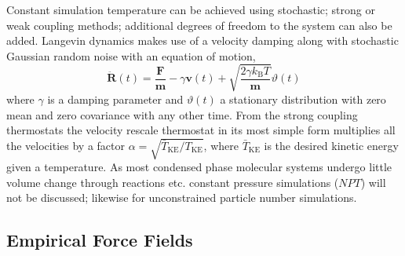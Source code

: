 \documentclass[main.tex]{subfiles}
\begin{document}
Constant simulation temperature can be achieved using stochastic; strong or weak coupling methods; additional degrees of freedom to the system can also be added. Langevin dynamics makes use of a velocity damping along with stochastic Gaussian random noise with an equation of motion,
\begin{equation}
	\ddot{\boldsymbol{R}}(t) = \frac{\boldsymbol{F}}{\boldsymbol{m}} - \gamma \boldsymbol{v}(t) + \sqrt{\frac{2\gamma k_\text{B} T}{\boldsymbol{m}}} \vartheta(t)
\end{equation}
where $\gamma$ is a damping parameter and $\vartheta(t)$ a stationary distribution with zero mean and zero covariance with any other time. From the strong coupling thermostats the velocity rescale thermostat in its most simple form multiplies all the velocities by a factor $\alpha = \sqrt{\bar{T}_\text{KE} / T_\text{KE}}$, where $\bar{T}_\text{KE}$ is the desired kinetic energy given a temperature.\cite{Bussi2007} As most condensed phase molecular systems undergo little volume change through reactions etc. constant pressure simulations ($NPT$) will not be discussed; likewise for unconstrained particle number simulations. 

\subsection{Empirical Force Fields}
\end{document}
